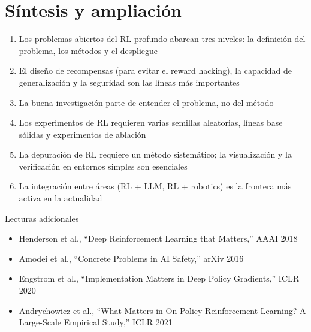 \section{Síntesis y ampliación}

\begin{enumerate}
    \item Los problemas abiertos del RL profundo abarcan tres niveles: la definición del problema, los métodos y el despliegue
    \item El diseño de recompensas (para evitar el reward hacking), la capacidad de generalización y la seguridad son las líneas más importantes
    \item La buena investigación parte de entender el problema, no del método
    \item Los experimentos de RL requieren varias semillas aleatorias, líneas base sólidas y experimentos de ablación
    \item La depuración de RL requiere un método sistemático; la visualización y la verificación en entornos simples son esenciales
    \item La integración entre áreas (RL + LLM, RL + robotics) es la frontera más activa en la actualidad
\end{enumerate}

\begin{knowledgebox}{Lecturas adicionales}
\begin{itemize}
    \item Henderson et al., ``Deep Reinforcement Learning that Matters,'' AAAI 2018
    \item Amodei et al., ``Concrete Problems in AI Safety,'' arXiv 2016
    \item Engstrom et al., ``Implementation Matters in Deep Policy Gradients,'' ICLR 2020
    \item Andrychowicz et al., ``What Matters in On-Policy Reinforcement Learning? A Large-Scale Empirical Study,'' ICLR 2021
\end{itemize}
\end{knowledgebox}


